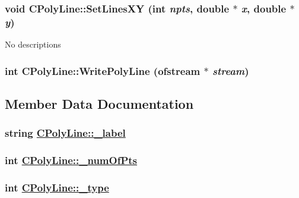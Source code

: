\hypertarget{classCPolyLine_a3}{
\subsubsection[SetLinesXY]{\setlength{\rightskip}{0pt plus 5cm}void CPoly\-Line::Set\-Lines\-XY (int {\em npts}, double $\ast$ {\em x}, double $\ast$ {\em y})}}
\label{classCPolyLine_a3}


No descriptions \hypertarget{classCPolyLine_a5}{
\subsubsection[WritePolyLine]{\setlength{\rightskip}{0pt plus 5cm}int CPoly\-Line::Write\-Poly\-Line (ofstream $\ast$ {\em stream})}}
\label{classCPolyLine_a5}




\subsection{Member Data Documentation}
\hypertarget{classCPolyLine_o3}{
\subsubsection[\_\-label]{\setlength{\rightskip}{0pt plus 5cm}string \hyperlink{classCPolyLine_o3}{CPoly\-Line::\_\-label}}}
\label{classCPolyLine_o3}


\hypertarget{classCPolyLine_o0}{
\subsubsection[\_\-numOfPts]{\setlength{\rightskip}{0pt plus 5cm}int \hyperlink{classCPolyLine_o0}{CPoly\-Line::\_\-num\-Of\-Pts}}}
\label{classCPolyLine_o0}


\hypertarget{classCPolyLine_o1}{
\subsubsection[\_\-type]{\setlength{\rightskip}{0pt plus 5cm}int \hyperlink{classCPolyLine_o1}{CPoly\-Line::\_\-type}}}
\label{classCPolyLine_o1}


